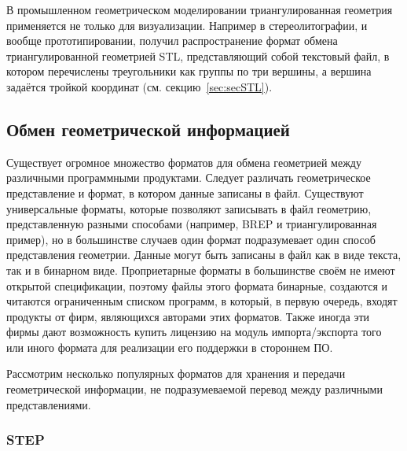 В промышленном геометрическом моделировании триангулированная геометрия применяется не только для визуализации. Например в стереолитографии, и вообще прототипировании, получил распространение формат обмена триангулированной геометрией STL, представляющий собой текстовый файл, в котором перечислены треугольники как группы по три вершины, а вершина задаётся тройкой координат (см. секцию~\ref{sec:secSTL}).

%                                                              

\subsection{Обмен геометрической информацией}\label{sec:secGeoFormats}

Существует огромное множество форматов для обмена геометрией между различными программными продуктами. Следует различать геометрическое представление и формат, в котором данные записаны в файл. Существуют универсальные форматы, которые позволяют записывать в файл геометрию, представленную разными способами (например, BREP и триангулированная \todo пример), но в большинстве случаев один формат подразумевает один способ представления геометрии. Данные могут быть записаны в файл как в виде текста, так и в бинарном виде. Проприетарные форматы в большинстве своём не имеют открытой спецификации, поэтому файлы этого формата бинарные, создаются и читаются ограниченным списком программ, в который, в первую очередь, входят продукты от фирм, являющихся авторами этих форматов. Также иногда эти фирмы дают возможность купить лицензию на модуль импорта/экспорта того или иного формата для реализации его поддержки в стороннем ПО.

Рассмотрим несколько популярных форматов для хранения и передачи геометрической информации, не подразумеваемой перевод между различными представлениями.

\subsubsection{STEP}\label{sec:secSTEP}

